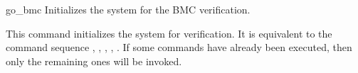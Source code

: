 \begin{nusmvCommand} {go\_bmc} {Initializes the system for the BMC verification.}


This command initializes the system for verification. It is equivalent
to the command sequence ,
, , \linebreak
{}, .  If some
commands have already been executed, then only the remaining ones will
be invoked.

\begin{cmdOpt}
\end{cmdOpt}

\end{nusmvCommand}
